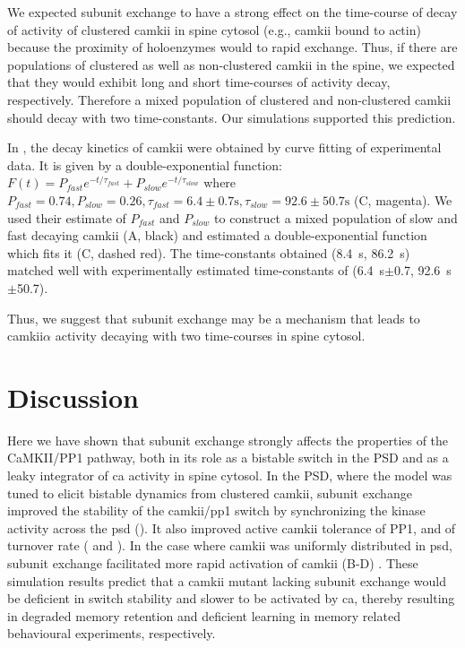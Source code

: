 \documentclass[9pt,lineno,doublespacing]{elife}
\begin{document}
We expected subunit exchange to have a strong effect on the time-course of decay of activity of
clustered \gls{camkii} in spine cytosol (e.g., \gls{camkii} bound to actin)
because the proximity of holoenzymes would to rapid exchange. Thus, if
there are populations of clustered as well as non-clustered \gls{camkii} in the
spine, we expected that they would exhibit long and short time-courses of
activity decay, respectively. Therefore a mixed population of clustered and
non-clustered \gls{camkii} should decay with two time-constants. Our
simulations supported this prediction. 

In \cite{chang_camkii_2017}, the decay kinetics of \gls{camkii} were obtained by
curve fitting of experimental data. It is given by a double-exponential
function: $F(t)=P_{fast}e^{-t/\tau_{fast}}+P_{slow}e^{-t/\tau_{slow}}$ where
$P_{fast}=0.74, P_{slow}=0.26, \tau_{fast}= 6.4\pm0.7 \si{\second},
\tau_{slow}=92.6 \pm 50.7\si{\second}$ (C, magenta). We
used their estimate of $P_{fast}$ and $P_{slow}$ to construct a mixed population
of slow and fast decaying \gls{camkii} (A, black) and
estimated a double-exponential function which fits it
(C, dashed red). The time-constants obtained
(\SI{8.4}{\second}, \SI{86.2}{\second}) matched well with experimentally
estimated time-constants of (\SI{6.4}{\second}$\pm$0.7,
\SI{92.6}{\second}$\pm$50.7). 

Thus, we suggest that subunit exchange may be a mechanism that leads to
\gls{camkii}$\alpha$ activity decaying with two time-courses in spine 
cytosol.

\section{Discussion}\label{discussion}

Here we have shown that subunit exchange strongly affects the properties of the
CaMKII/PP1 pathway, both in its role as a bistable switch in the PSD and as a
leaky integrator of \gls{ca} activity in spine cytosol. In the PSD, where the
model was tuned to elicit bistable dynamics from clustered \gls{camkii}, subunit
exchange improved the stability of the \gls{camkii}/\gls{pp1} switch by
synchronizing the kinase activity across the \gls{psd}
(). It also improved active \gls{camkii} tolerance of
PP1, and of turnover rate ( and ). In the case
where \gls{camkii} was uniformly distributed in \gls{psd}, subunit exchange
facilitated more rapid activation of \gls{camkii}
(B-D)
\citep{stratton_activation-triggered_2014}. These simulation results predict
that a \gls{camkii} mutant lacking subunit exchange would be deficient in switch
stability and slower to be activated by \gls{ca}, thereby resulting in degraded
memory retention and deficient learning in memory related behavioural
experiments, respectively.
\end{document}
